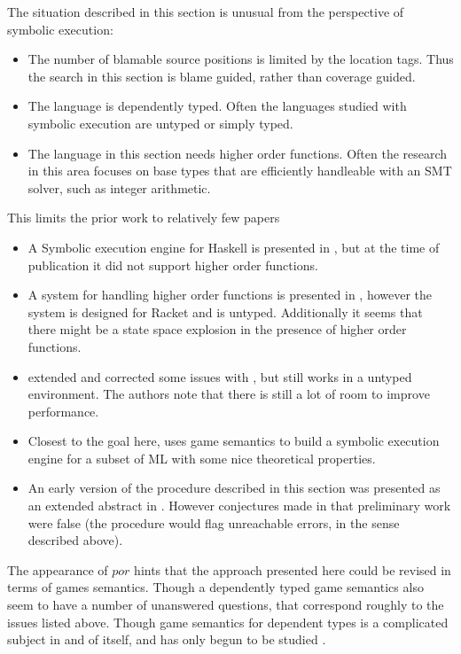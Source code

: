 The situation described in this section is unusual from the perspective of symbolic execution:
\begin{itemize}
\item The number of blamable source positions is limited by the location tags.
Thus the search in this section is blame guided, rather than coverage guided.
\item The language is dependently typed.
Often the languages studied with symbolic execution are untyped or simply typed.
\item The language in this section needs higher order functions.
Often the research in this area focuses on base types that are efficiently handleable with an SMT solver, such as integer arithmetic.
\end{itemize}
This limits the prior work to relatively few papers
\begin{itemize}
\item
A Symbolic execution engine for Haskell is presented in \cite{10.1145/3314221.3314618}, but at the time of publication it did not support higher order functions.
\item
A system for handling higher order functions is presented in \cite{nguyen2017higher}, however the system is designed for Racket and is untyped.
Additionally it seems that there might be a state space explosion in the presence of higher order functions.
\item \cite{10.1007/978-3-030-72019-3_23} extended and corrected some issues with \cite{nguyen2017higher}, but still works in a untyped environment.
The authors note that there is still a lot of room to improve performance.
\item Closest to the goal here, \cite{lin_et_al:LIPIcs:2020:12349} uses game semantics to build a symbolic execution engine for a subset of ML with some nice theoretical properties.
\item An early version of the procedure described in this section was presented as an extended abstract in \cite{extendedabstract}.
However conjectures made in that preliminary work were false (the procedure would flag unreachable errors, in the sense described above).
\end{itemize}
The appearance of $por$ hints that the approach presented here could be revised in terms of games semantics.
Though a dependently typed game semantics also seem to have a number of unanswered questions, that correspond roughly to the issues listed above.
Though game semantics for dependent types is a complicated subject in and of itself, and has only begun to be studied \cite{VAKAR2018401}.

